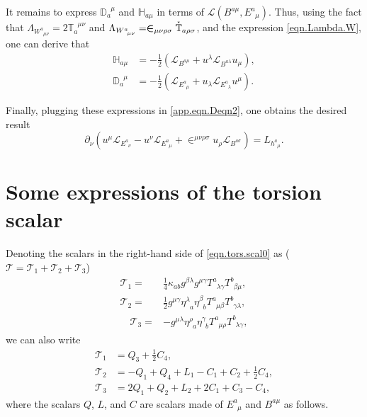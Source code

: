 \documentclass[
10pt, %
a4paper, %
oneside, %
twocolumn,
headinclude,footinclude, %
BCOR5mm, %
]{scrartcl}
\newcommand{\mg}[1]{\kappa_{#1}}			%
\newcommand{\tetrsymbol}{h}
\newcommand{\itetrsymbol}{\eta}
\newcommand{\itetr}[2]{\itetrsymbol^{#1}_{\phantom{#1}#2}}
\newcommand{\tetr}[2]{\tetrsymbol^{#1}_{\phantom{#1}#2}}
\newcommand{\D}[1]{\partial_{#1}} %
\newcommand{\Tors}[2]{T^{#1}_{\phantom{#1}#2}}
\newcommand{\ET}[2]{E^{#1}_{\phantom{#1}#2}}	%
\newcommand{\BT}[2]{B^{#1#2}}	%
\newcommand{\w}[2]{W^{#1}_{\phantom{#1}#2}}
\newcommand{\Lag}{\Lambda}	%
\newcommand{\Laghodge}{L}%
\newcommand{\LagBE}{\mathcal{L}}%
\newcommand{\LCsymb}{\bm{\in}}    %
\newcommand{\TorsConj}[2]{\mathbb{T}_{#1}^{\phantom{#1}#2}}
\newcommand{\HTConj}[1]{\accentset{\star}{\mathbb{T}}_{#1}}
\newcommand{\Dbb}[2]{\mathbb{D}_{#1}^{\phantom{#1}#2}}
\newcommand{\Hbb}[2]{\mathbb{H}_{#1#2}}
\newcommand{\Tscal}{\mathcal{T}}		%
\begin{document}
	It remains to express $ \Dbb{a}{\mu} $ and $ \Hbb{a}{\mu} $ in terms of $ 
	\LagBE(\BT{a}{\mu},\ET{a}{\mu}) $. Thus, using the fact that $ \Lag_{\w{a}{\mu\nu}} = 2 
	\TorsConj{a}{\mu\nu} $ and $ \Lag_{\w{a}{\mu\nu}} = \LCsymb_{\mu\nu\rho\sigma} 
	\HTConj{a\rho\sigma} 
	$,  and the expression \eqref{eqn.Lambda.W}, one can derive that
	\begin{subequations}
		\begin{align}%
			\Hbb{a}{\mu} &=-\frac12 \left( \LagBE_{\BT{a}{\mu}} + u^\lambda 
			\LagBE_{\BT{a}{\lambda}} 
			u_\mu 
			\right),
			\\
			\Dbb{a}{\mu} &=-\frac12 \left( \LagBE_{\ET{a}{\mu}} + u_\lambda 
			\LagBE_{\ET{a}{\lambda}} 
			u^\mu 
			\right).
		\end{align}
	\end{subequations}
	
	Finally, plugging these expressions in 
	\eqref{app.eqn.Deqn2}, one obtains the desired result 
	\begin{equation}
		\D{\nu}( u^\mu\LagBE_{\ET{a}{\nu}} - u^\nu \LagBE_{\ET{a}{\mu}} + 
		\LCsymb^{\mu\nu\rho\sigma}u_\rho\LagBE_{\BT{a}{\sigma}}) 
		= \Laghodge_{\tetr{a}{\mu}}.
	\end{equation}
	
	
	
	\section{Some expressions of the torsion scalar}
	
	Denoting the scalars in the right-hand side of \eqref{eqn.tors.scal0} as ($ \Tscal = \Tscal_1 + 
	\Tscal_2 + \Tscal_3 $)
	\begin{subequations}
		\begin{align}\label{eqn.tors.scal}
			\Tscal_1 = & \frac14 \mg{ab}g^{\beta\lambda }g^{\mu\gamma 
			}\Tors{a}{\lambda\gamma} \Tors{b}{\beta\mu },\\[2mm]
			\Tscal_2 = & \frac12 g^{\mu\gamma} \itetr{\lambda}{a} \itetr{\beta}{b} 
			\Tors{a}{\mu\beta} 
			\Tors{b}{\gamma\lambda},\\[2mm]
			\quad
			\Tscal_3 = & -g^{\mu\lambda} \itetr{\rho}{a} \itetr{\gamma}{b} \Tors{a}{\mu\rho} 
			\Tors{b}{\lambda\gamma},	  
		\end{align}
	\end{subequations}
	we can also write 
	\begin{subequations}
		\begin{align}\label{eqn.tors.scal.TQLC}
			\mathcal{T}_1 &= Q_3 + \frac12 C_4, \\
			\mathcal{T}_2 &=- Q_1 + Q_4 + L_1 -C_1 + C_2 + \frac12 C_4, \\[2mm]
			\mathcal{T}_3 &= 2 Q_1 + Q_2 + L_2 + 2 C_1 + C_3 - C_4,
		\end{align}
	\end{subequations}
	where the scalars $ Q $, $ L $, and $ C $ are scalars made of $ \ET{a}{\mu} $ and 
	$ \BT{a}{\mu} $ as follows.
	
\end{document}
